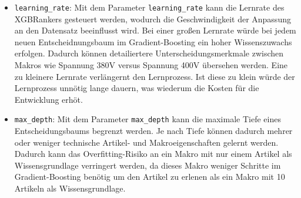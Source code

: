 \begin{itemize}
 


\item \texttt{learning\_rate}: Mit dem Parameter \texttt{learning\_rate} kann die Lernrate des XGBRankers gesteuert werden, wodurch die Geschwindigkeit der Anpassung an den Datensatz beeinflusst wird.
Bei einer großen Lernrate würde bei jedem neuen Entscheidnungsbaum im Gradient-Boosting ein hoher Wissenszuwachs erfolgen. Dadurch können detailiertere Unterscheidungsmerkmale zwischen Makros wie Spannung 380V versus Spannung 400V übersehen werden.
Eine zu kleinere Lernrate verlängernt den Lernprozess. Ist diese zu klein würde der Lernprozess unnötig lange dauern, was wiederum die Kosten für die Entwicklung erhöt.

\item \texttt{max\_depth}: Mit dem Parameter \texttt{max\_depth} kann die maximale Tiefe eines Entscheidungsbaums begrenzt werden. Je nach Tiefe können dadurch mehrer oder weniger technische Artikel- und Makroeigenschaften gelernt werden.
Dadurch kann das Overfitting-Risiko an ein Makro mit nur einem Artikel als Wissensgrundlage verringert werden, da dieses Makro weniger Schritte im Gradient-Boosting benötig um den Artikel zu erlenen als ein Makro mit 10 Artikeln als Wissensgrundlage.



\end{itemize}
